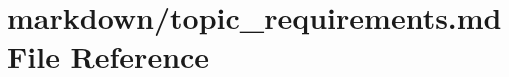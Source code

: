 \hypertarget{topic__requirements_8md}{}\section{markdown/topic\+\_\+requirements.md File Reference}
\label{topic__requirements_8md}
